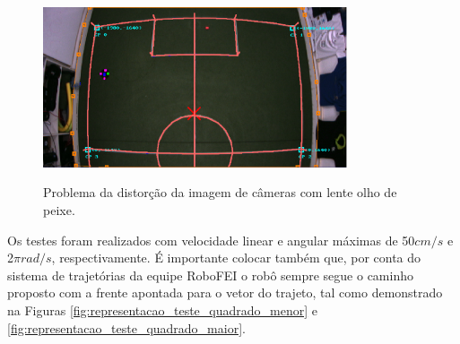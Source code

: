 \documentclass[acronym, symbols, table, deposito]{fei}
\begin{document}
		\begin{figure}[!htb]
			\centering
			\caption{Problema da distorção da imagem de câmeras com lente olho de peixe.}
			\includegraphics[width=0.80\textwidth]{problema_distorcao_2.png}
			\label{fig:problema_distorcao}
		\end{figure}
	
		Os testes foram realizados com velocidade linear e angular máximas de 50$cm/s$ e 2$\pi$$rad/s$, respectivamente. É importante colocar também que, por conta do sistema de trajetórias da equipe RoboFEI o robô sempre segue o caminho proposto com a frente apontada para o vetor do trajeto, tal como demonstrado na Figuras \ref{fig:representacao_teste_quadrado_menor} e \ref{fig:representacao_teste_quadrado_maior}.
		
\end{document}
